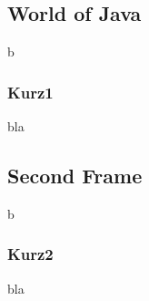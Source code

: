 \begin{frame}
	\part[World of Java]{World of Java}
	b
	\section[Kurz1]{Kurz1}
	bla
\end{frame}

\begin{frame}
	\part[Second Frame]{Second Frame}
	b
	\section[Kurz2]{Kurz2}
	bla
\end{frame}